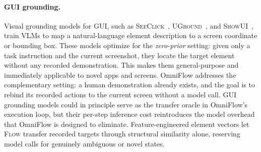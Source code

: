 \paragraph{GUI grounding.}
Visual grounding models for GUI, such as
\textsc{SeeClick}~\cite{cheng2024seeclick},
\textsc{UGround}~\cite{gou2024uground}, and
\textsc{ShowUI}~\cite{lin2025showui},
train VLMs to map a natural-language element description to a screen
coordinate or bounding box.
These models optimize for the \emph{zero-prior} setting: given only a
task instruction and the current screenshot, they locate the target
element without any recorded demonstration.
This makes them general-purpose and immediately applicable to novel apps
and screens.
OmniFlow addresses the complementary setting: a human demonstration
already exists, and the goal is to rebind its recorded actions to the
current screen without a model call.
GUI grounding models could in principle serve as the transfer oracle in
OmniFlow's execution loop, but their per-step inference cost reintroduces
the model overhead that OmniFlow is designed to eliminate.
Feature-engineered element vectors let \textsc{Flow} transfer recorded
targets through structural similarity alone, reserving model calls for
genuinely ambiguous or novel states.
 